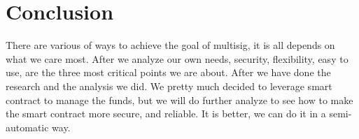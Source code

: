 \section{Conclusion}
\label{sec:conclusion}

There are various of ways to achieve the goal of multisig, it is all depends on what we care most. After we analyze our own needs, security, flexibility, easy to use, are the three most critical points we are about. After we have done the research and the analysis we did. We pretty much decided to leverage smart contract to manage the funds, but we will do further analyze to see how to make the smart contract more secure, and reliable. It is better, we can do it in a semi-automatic way.
